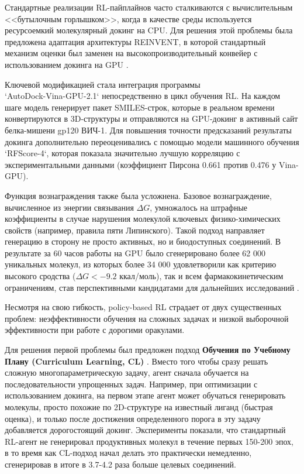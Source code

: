 
Стандартные реализации RL-пайплайнов часто сталкиваются с вычислительным <<бутылочным горлышком>>, когда в качестве среды используется ресурсоемкий молекулярный докинг на CPU. Для решения этой проблемы была предложена адаптация архитектуры REINVENT, в которой стандартный механизм оценки был заменен на высокопроизводительный конвейер с использованием докинга на GPU \cite{воробьев2024адаптация}.

Ключевой модификацией стала интеграция программы \\ `AutoDock-Vina-GPU-2.1` непосредственно в цикл обучения RL. На каждом шаге модель генерирует пакет SMILES-строк, которые в реальном времени конвертируются в 3D-структуры и отправляются на GPU-докинг в активный сайт белка-мишени gp120 ВИЧ-1. Для повышения точности предсказаний результаты докинга дополнительно переоценивались с помощью модели машинного обучения `RFScore-4`, которая показала значительно лучшую корреляцию с экспериментальными данными (коэффициент Пирсона 0.661 против 0.476 у Vina-GPU).

Функция вознаграждения также была усложнена. Базовое вознаграждение, вычисленное из энергии связывания $\Delta G$, умножалось на штрафные коэффициенты в случае нарушения молекулой ключевых физико-химических свойств (например, правила пяти Липинского). Такой подход направляет генерацию в сторону не просто активных, но и биодоступных соединений.
В результате за 60 часов работы на GPU было сгенерировано более 62 000 уникальных молекул, из которых более 34 000 удовлетворили как критерию высокого сродства ($\Delta G < -9.2$ ккал/моль), так и всем фармакокинетическим ограничениям, став перспективными кандидатами для дальнейших исследований \cite{воробьев2024адаптация}.


Несмотря на свою гибкость, policy-based RL страдает от двух существенных проблем: неэффективности обучения на сложных задачах и низкой выборочной эффективности при работе с дорогими оракулами.

Для решения первой проблемы был предложен подход \textbf{Обучения по Учебному Плану (Curriculum Learning, CL)} \cite{guo2022improving}. Вместо того чтобы сразу решать сложную многопараметрическую задачу, агент сначала обучается на последовательности упрощенных задач. Например, при оптимизации с использованием докинга, на первом этапе агент может обучаться генерировать молекулы, просто похожие по 2D-структуре на известный лиганд (быстрая оценка), и только после достижения определенного порога в эту задачу добавляется дорогостоящий докинг. Эксперименты показали, что стандартный RL-агент не генерировал продуктивных молекул в течение первых 150-200 эпох, в то время как CL-подход начал делать это практически немедленно, сгенерировав в итоге в 3.7-4.2 раза больше целевых соединений.

